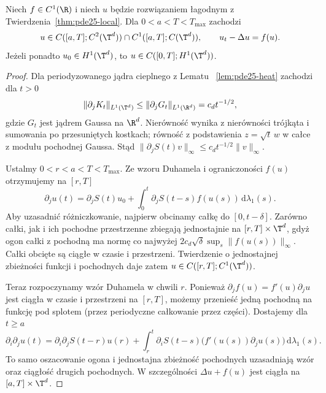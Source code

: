 \begin{twierdzenie}
\label{thm:pde25-parabolic-regularity}
Niech $f\in C^1(\R)$ i niech $u$ będzie rozwiązaniem
łagodnym z Twierdzenia~\ref{thm:pde25-local}.
Dla $0<a<T<T_{\max}$ zachodzi
\[
 u\in C([a,T];C^2(\T^d))\cap C^1([a,T];C(\T^d)),
 \qquad u_t-\Delta u=f(u).
\]
Jeżeli ponadto $u_0\in H^1(\T^d)$, to
$u\in C([0,T];H^1(\T^d))$.
\end{twierdzenie}
\begin{proof}
Dla periodyzowanego jądra cieplnego z Lematu
~\ref{lem:pde25-heat} zachodzi dla $t>0$
\[
 \|\partial_j K_t\|_{L^1(\T^d)}
 \le\|\partial_j G_t\|_{L^1(\R^d)}
 =c_d t^{-1/2},
\]
gdzie $G_t$ jest jądrem Gaussa na $\R^d$.
Nierówność wynika z nierówności trójkąta i sumowania
po przesuniętych kostkach; równość z podstawienia
$z=\sqrt t\,w$ w całce z modułu pochodnej Gaussa.
Stąd $\|\partial_j S(t)v\|_\infty
\le c_dt^{-1/2}\|v\|_\infty$.

Ustalmy $0<r<a<T<T_{\max}$. Ze wzoru Duhamela
i ograniczoności $f(u)$ otrzymujemy na $[r,T]$
\[
 \partial_j u(t)=\partial_j S(t)u_0+
 \int_0^t\partial_j S(t-s)f(u(s))\,
 \mathrm d\lambda_1(s).
\]
Aby uzasadnić różniczkowanie, najpierw obcinamy
całkę do $[0,t-\delta]$. Zarówno całki, jak i ich
pochodne przestrzenne zbiegają jednostajnie na
$[r,T]\times\T^d$, gdyż ogon całki z pochodną ma
normę co najwyżej $2c_d\sqrt\delta
\sup_s\|f(u(s))\|_\infty$. Całki obcięte są ciągłe
w czasie i przestrzeni. Twierdzenie o jednostajnej
zbieżności funkcji i pochodnych daje zatem
$u\in C([r,T];C^1(\T^d))$.

Teraz rozpoczynamy wzór Duhamela w chwili $r$.
Ponieważ $\partial_j f(u)=f'(u)\partial_j u$
jest ciągła w czasie i przestrzeni na $[r,T]$,
możemy przenieść jedną pochodną na funkcję
pod splotem (przez periodyczne całkowanie przez części).
Dostajemy dla $t\ge a$
\[
 \partial_i\partial_j u(t)=\partial_i\partial_j S(t-r)u(r)
 +\int_r^t\partial_i S(t-s)
       \bigl(f'(u(s))\partial_j u(s)\bigr)\,
       \mathrm d\lambda_1(s).
\]
To samo oszacowanie ogona i jednostajna zbieżność
pochodnych uzasadniają wzór oraz ciągłość drugich
pochodnych. W szczególności $\Delta u+f(u)$ jest
ciągła na $[a,T]\times\T^d$.


\end{proof}
